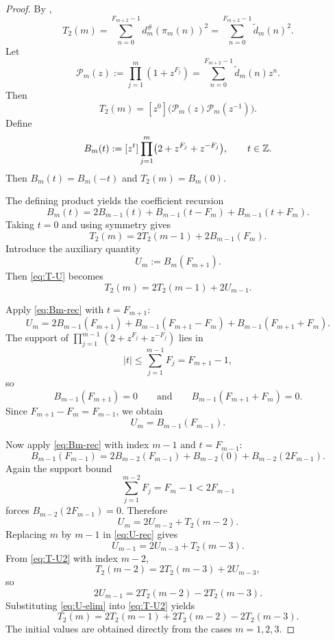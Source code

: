 \begin{proof}
By ,
\[
  T_2(m)
  =
  \sum_{n=0}^{F_{m+2}-1}d_m^\#(\pi_m(n))^2
  =
  \sum_{n=0}^{F_{m+2}-1}\widetilde d_m(n)^2.
\]
Let
\[
  \mathcal P_m(z):=\prod_{j=1}^m(1+z^{F_j})
  =
  \sum_{n=0}^{F_{m+2}-1}\widetilde d_m(n)z^n.
\]
Then
\[
  T_2(m)
  =
  [z^0]\bigl(\mathcal P_m(z)\mathcal P_m(z^{-1})\bigr).
\]
Define
\[
  B_m(t):=[z^t]\prod_{j=1}^m\bigl(2+z^{F_j}+z^{-F_j}\bigr),
  \qquad t\in\mathbb{Z}.
\]
Then \(B_m(t)=B_m(-t)\) and \(T_2(m)=B_m(0)\).

The defining product yields the coefficient recursion
\begin{equation}\label{eq:Bm-rec}
  B_m(t)=2B_{m-1}(t)+B_{m-1}(t-F_m)+B_{m-1}(t+F_m).
\end{equation}
Taking \(t=0\) and using symmetry gives
\begin{equation}\label{eq:T-U}
  T_2(m)=2T_2(m-1)+2B_{m-1}(F_m).
\end{equation}
Introduce the auxiliary quantity
\[
  U_m:=B_m(F_{m+1}).
\]
Then \eqref{eq:T-U} becomes
\begin{equation}\label{eq:T-U2}
  T_2(m)=2T_2(m-1)+2U_{m-1}.
\end{equation}

Apply \eqref{eq:Bm-rec} with \(t=F_{m+1}\):
\[
  U_m
  =
  2B_{m-1}(F_{m+1})
  +B_{m-1}(F_{m+1}-F_m)
  +B_{m-1}(F_{m+1}+F_m).
\]
The support of \(\prod_{j=1}^{m-1}(2+z^{F_j}+z^{-F_j})\) lies in
\[
  |t|\le \sum_{j=1}^{m-1}F_j=F_{m+1}-1,
\]
so
\[
  B_{m-1}(F_{m+1})=0
  \qquad\text{and}\qquad
  B_{m-1}(F_{m+1}+F_m)=0.
\]
Since \(F_{m+1}-F_m=F_{m-1}\), we obtain
\begin{equation}\label{eq:U-shift}
  U_m=B_{m-1}(F_{m-1}).
\end{equation}

Now apply \eqref{eq:Bm-rec} with index \(m-1\) and \(t=F_{m-1}\):
\[
  B_{m-1}(F_{m-1})
  =
  2B_{m-2}(F_{m-1})
  +B_{m-2}(0)
  +B_{m-2}(2F_{m-1}).
\]
Again the support bound
\[
  \sum_{j=1}^{m-2}F_j=F_m-1<2F_{m-1}
\]
forces \(B_{m-2}(2F_{m-1})=0\).  Therefore
\begin{equation}\label{eq:U-rec}
  U_m=2U_{m-2}+T_2(m-2).
\end{equation}
Replacing \(m\) by \(m-1\) in \eqref{eq:U-rec} gives
\[
  U_{m-1}=2U_{m-3}+T_2(m-3).
\]
From \eqref{eq:T-U2} with index \(m-2\),
\[
  T_2(m-2)=2T_2(m-3)+2U_{m-3},
\]
so
\begin{equation}\label{eq:U-elim}
  2U_{m-1}=2T_2(m-2)-2T_2(m-3).
\end{equation}
Substituting \eqref{eq:U-elim} into \eqref{eq:T-U2} yields
\[
  T_2(m)=2T_2(m-1)+2T_2(m-2)-2T_2(m-3).
\]
The initial values are obtained directly from the cases \(m=1,2,3\).
\end{proof}

